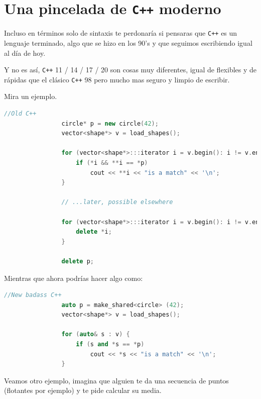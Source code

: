 \documentclass[12pt, fleqn]{report}                             %
\theoremstyle{break}                                            %
\newcommand{\textCode}[1]  { \texttt{#1} }                      %
\newcommand{\Cpp}{\ignorespaces\textCode{C++}}                  %
\begin{document}
        \clearpage
        \section{ Una pincelada de \Cpp moderno}

            Incluso en términos solo de sintaxis te perdonaría si pensaras que \Cpp es un
            lenguaje terminado, algo que se hizo en los 90's y que seguimos escribiendo
            igual al día de hoy.

            Y no es así, \Cpp 11 / 14 / 17 / 20 son cosas muy diferentes, igual de flexibles
            y de rápidas que el clásico \Cpp 98 pero mucho mas seguro y limpio de escribir.

            Mira un ejemplo.

            \begin{lstlisting}[language=C++, gobble=16]
                //Old C++
                circle* p = new circle(42);
                vector<shape*> v = load_shapes();

                for (vector<shape*>:::iterator i = v.begin(): i != v.end(); ++i) {
                    if (*i && **i == *p)
                        cout << **i << "is a match" << '\n';
                }

                // ...later, possible elsewhere

                for (vector<shape*>:::iterator i = v.begin(): i != v.end(); ++i) {
                    delete *i;
                }

                delete p;
            \end{lstlisting}

            Mientras que ahora podrías hacer algo como:
            \begin{lstlisting}[language=C++, gobble=16]
                //New badass C++
                auto p = make_shared<circle> (42);
                vector<shape*> v = load_shapes();

                for (auto& s : v) {
                    if (s and *s == *p)
                        cout << *s << "is a match" << '\n';
                }
            \end{lstlisting}

            \clearpage

            Veamos otro ejemplo, imagina que alguien te da una secuencia de 
            puntos (flotantes por ejemplo) y te pide calcular su media.
\end{document}
